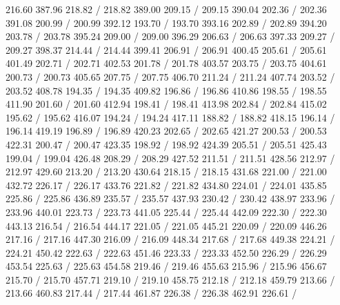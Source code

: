 { 216.60 387.96 218.82 /
 218.82 389.00 209.15 /
 209.15 390.04 202.36 /
 202.36 391.08 200.99 /
 200.99 392.12 193.70 /
 193.70 393.16 202.89 /
 202.89 394.20 203.78 /
 203.78 395.24 209.00 /
 209.00 396.29 206.63 /
 206.63 397.33 209.27 /
 209.27 398.37 214.44 /
 214.44 399.41 206.91 /
 206.91 400.45 205.61 /
 205.61 401.49 202.71 /
 202.71 402.53 201.78 /
 201.78 403.57 203.75 /
 203.75 404.61 200.73 /
 200.73 405.65 207.75 /
 207.75 406.70 211.24 /
 211.24 407.74 203.52 /
 203.52 408.78 194.35 /
 194.35 409.82 196.86 /
 196.86 410.86 198.55 /
 198.55 411.90 201.60 /
 201.60 412.94 198.41 /
 198.41 413.98 202.84 /
 202.84 415.02 195.62 /
 195.62 416.07 194.24 /
 194.24 417.11 188.82 /
 188.82 418.15 196.14 /
 196.14 419.19 196.89 /
 196.89 420.23 202.65 /
 202.65 421.27 200.53 /
 200.53 422.31 200.47 /
 200.47 423.35 198.92 /
 198.92 424.39 205.51 /
 205.51 425.43 199.04 /
 199.04 426.48 208.29 /
 208.29 427.52 211.51 /
 211.51 428.56 212.97 /
 212.97 429.60 213.20 /
 213.20 430.64 218.15 /
 218.15 431.68 221.00 /
 221.00 432.72 226.17 /
 226.17 433.76 221.82 /
 221.82 434.80 224.01 /
 224.01 435.85 225.86 /
 225.86 436.89 235.57 /
 235.57 437.93 230.42 /
 230.42 438.97 233.96 /
 233.96 440.01 223.73 /
 223.73 441.05 225.44 /
 225.44 442.09 222.30 /
 222.30 443.13 216.54 /
 216.54 444.17 221.05 /
 221.05 445.21 220.09 /
 220.09 446.26 217.16 /
 217.16 447.30 216.09 /
 216.09 448.34 217.68 /
 217.68 449.38 224.21 /
 224.21 450.42 222.63 /
 222.63 451.46 223.33 /
 223.33 452.50 226.29 /
 226.29 453.54 225.63 /
 225.63 454.58 219.46 /
 219.46 455.63 215.96 /
 215.96 456.67 215.70 /
 215.70 457.71 219.10 /
 219.10 458.75 212.18 /
 212.18 459.79 213.66 /
 213.66 460.83 217.44 /
 217.44 461.87 226.38 /
 226.38 462.91 226.61 /
}
